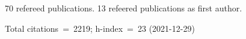 70 refereed publications. 13 refeered publications as first author.

Total citations~=~2219; h-index~=~23 (2021-12-29)